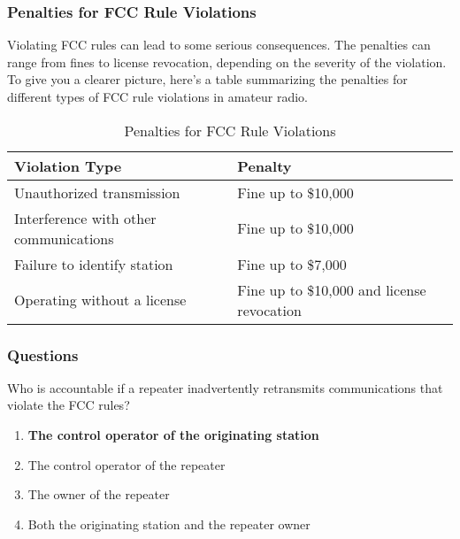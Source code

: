 
\subsubsection*{Penalties for FCC Rule Violations}
Violating FCC rules can lead to some serious consequences. The penalties can range from fines to license revocation, depending on the severity of the violation. To give you a clearer picture, here's a table summarizing the penalties for different types of FCC rule violations in amateur radio.

\begin{table}[h]
    \centering
    \caption{Penalties for FCC Rule Violations}
    \label{tab:fcc-violation-penalties}
    \begin{tabular}{|l|l|}
        \hline
        \textbf{Violation Type} & \textbf{Penalty} \\
        \hline
        Unauthorized transmission & Fine up to \$10,000 \\
        Interference with other communications & Fine up to \$10,000 \\
        Failure to identify station & Fine up to \$7,000 \\
        Operating without a license & Fine up to \$10,000 and license revocation \\
        \hline
    \end{tabular}
\end{table}

\subsubsection{Questions}

\begin{tcolorbox}[colback=gray!10!white,colframe=black!75!black,title={T1F10}]
    Who is accountable if a repeater inadvertently retransmits communications that violate the FCC rules?
    \begin{enumerate}[label=\Alph*),noitemsep]
        \item \textbf{The control operator of the originating station}
        \item The control operator of the repeater
        \item The owner of the repeater
        \item Both the originating station and the repeater owner
    \end{enumerate}
\end{tcolorbox}

